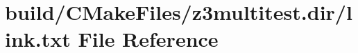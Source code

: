\hypertarget{z3multitest_8dir_2link_8txt}{}\section{build/\+C\+Make\+Files/z3multitest.dir/link.txt File Reference}
\label{z3multitest_8dir_2link_8txt}
